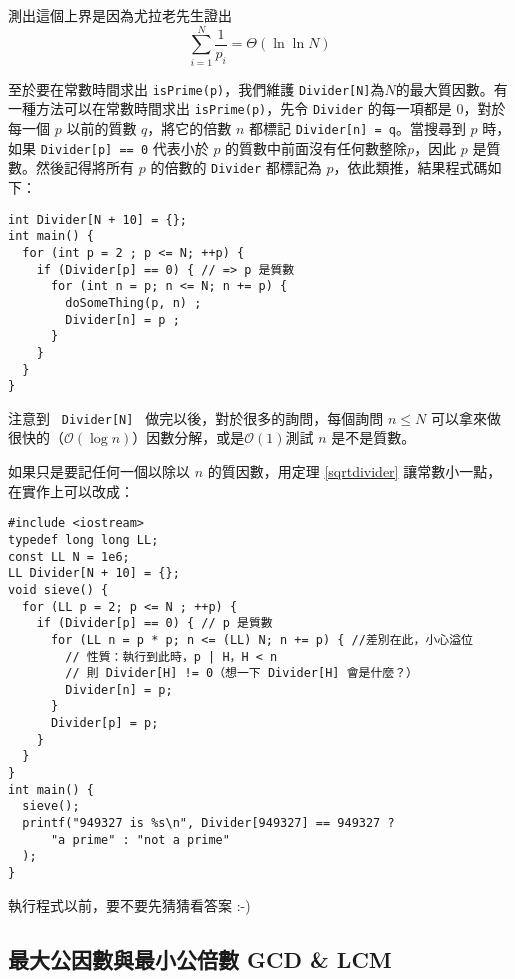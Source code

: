 測出這個上界是因為尤拉老先生證出
$$\sum_{i=1}^N\frac 1{p_i}=\Theta(\ln\ln N)$$

至於要在常數時間求出 \lstinline{isPrime(p)}，我們維護 \lstinline{Divider[N]}為$N$的最大質因數。有一種方法可以在常數時間求出 \lstinline{isPrime(p)}，先令 \lstinline{Divider} 的每一項都是 $0$，對於每一個 $p$ 以前的質數 $q$，將它的倍數 $n$ 都標記 \lstinline{Divider[n] = q}。當搜尋到 $p$ 時，如果  \lstinline{Divider[p] == 0} 代表小於 $p$ 的質數中前面沒有任何數整除$p$，因此 $p$ 是質數。然後記得將所有 $p$ 的倍數的 \lstinline{Divider} 都標記為 $p$，依此類推，結果程式碼如下：

\begin{lstlisting}[caption=篩法, label=sieveAlgorithm]
int Divider[N + 10] = {};
int main() {
  for (int p = 2 ; p <= N; ++p) {
    if (Divider[p] == 0) { // => p 是質數
      for (int n = p; n <= N; n += p) {
        doSomeThing(p, n) ;
        Divider[n] = p ;
      }
    }
  }
}
\end{lstlisting}
注意到 \lstinline{ Divider[N] } %
做完以後，對於很多的詢問，每個詢問 $n\leq N$ 可以拿來做很快的（$\mathcal{O}(\log n)$）因數分解，或是$\mathcal{O}(1)$測試 $n$ 是不是質數。


如果只是要記任何一個以除以 $n$ 的質因數，用定理 \ref{sqrtdivider} 讓常數小一點，在實作上可以改成：

\begin{lstlisting}[caption=使用篩法測試質因數]
#include <iostream>
typedef long long LL;
const LL N = 1e6;
LL Divider[N + 10] = {};
void sieve() {
  for (LL p = 2; p <= N ; ++p) {
    if (Divider[p] == 0) { // p 是質數
      for (LL n = p * p; n <= (LL) N; n += p) { //差別在此，小心溢位
        // 性質：執行到此時，p | H，H < n
        // 則 Divider[H] != 0（想一下 Divider[H] 會是什麼？）
        Divider[n] = p;
      }
      Divider[p] = p;
    }
  }
}
int main() {
  sieve();
  printf("949327 is %s\n", Divider[949327] == 949327 ?
      "a prime" : "not a prime"
  );
}
\end{lstlisting}

執行程式以前，要不要先猜猜看答案 :-)


\subsection{最大公因數與最小公倍數 GCD \& LCM}
\label{sec:div:gcd}

